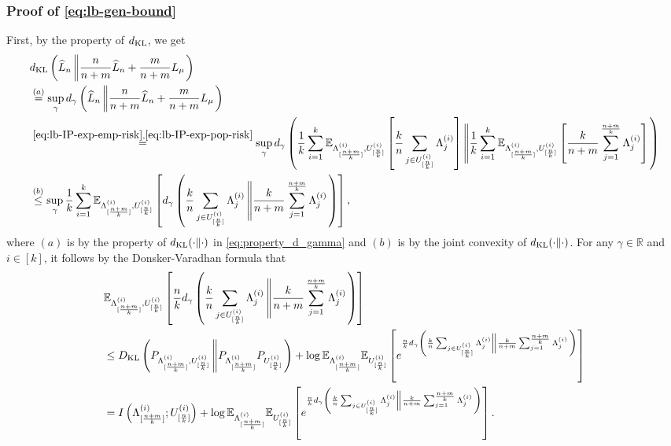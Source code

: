 \documentclass[onecolumn,romanappendices,10pt]{IEEEtran}
\newcommand{\EE}{{\mathbb{E}}}
\newcommand{\RR}{{\mathbb{R}}}
\begin{document}
	\subsubsection{Proof of \eqref{eq:lb-gen-bound}}
	First, by the property of $d_{\textnormal{KL}}$, we get
	\begin{equation}
		\begin{aligned}
			&d_{\textnormal{KL}} \left(\widehat{L}_n \left\| \frac{n}{n+m} \widehat{L}_n + \frac{m}{n+m} L_\mu \right.\right) \\
			&\overset{(a)}{=} \sup_{\gamma} d_{\gamma} \left(\widehat{L}_n \left\| \frac{n}{n+m} \widehat{L}_n + \frac{m}{n+m} L_\mu \right.\right) \\
			&\overset{\eqref{eq:lb-IP-exp-emp-risk}, \eqref{eq:lb-IP-exp-pop-risk}}{=} \sup_{\gamma} d_{\gamma} \left(\frac{1}{k} \sum_{i=1}^k \EE_{\Lambda^{(i)}_{[\frac{n+m}{k}]}, U^{(i)}_{[\frac{n}{k}]}} \left[ \frac{k}{n} \sum_{j \in U^{(i)}_{[\frac{n}{k}]}} \Lambda^{(i)}_j \right] \left\| \frac{1}{k} \sum_{i=1}^k \EE_{\Lambda^{(i)}_{[\frac{n+m}{k}]}, U^{(i)}_{[\frac{n}{k}]}} \left[ \frac{k}{n+m} \sum_{j=1}^{\frac{n+m}{k}} \Lambda^{(i)}_j \right] \right.\right) \\
			&\overset{(b)}{\leq} \sup_{\gamma} \frac{1}{k} \sum_{i=1}^k \EE_{\Lambda^{(i)}_{[\frac{n+m}{k}]}, U^{(i)}_{[\frac{n}{k}]}} \left[ d_{\gamma} \left( \frac{k}{n} \sum_{j \in U^{(i)}_{[\frac{n}{k}]}} \Lambda^{(i)}_j \left\| \frac{k}{n+m} \sum_{j=1}^{\frac{n+m}{k}} \Lambda^{(i)}_j \right. \right) \right],
		\end{aligned}
	\end{equation}
	where $(a)$ is by the property of $d_{\textnormal{KL}}(\cdot \| \cdot)$ in \eqref{eq:property_d_gamma} and $(b)$ is by the joint convexity of $d_{\textnormal{KL}}(\cdot \| \cdot)$. For any $\gamma \in \RR$ and $i \in [k]$, it follows by the Donsker-Varadhan formula that
	\begin{equation}
		\begin{aligned}
			&\EE_{\Lambda^{(i)}_{[\frac{n+m}{k}]}, U^{(i)}_{[\frac{n}{k}]}} \left[ \frac{n}{k} d_{\gamma} \left( \frac{k}{n} \sum_{j \in U^{(i)}_{[\frac{n}{k}]}} \Lambda^{(i)}_j \left\| \frac{k}{n+m} \sum_{j=1}^{\frac{n+m}{k}} \Lambda^{(i)}_j \right. \right) \right] \\
			&\leq D_{\textnormal{KL}}\left( P_{\Lambda^{(i)}_{[\frac{n+m}{k}]},  U^{(i)}_{[\frac{n}{k}]}} \left\| P_{\Lambda^{(i)}_{[\frac{n+m}{k}]}} P_{U^{(i)}_{[\frac{n}{k}]}} \right.\right) + \log \EE_{\Lambda^{(i)}_{[\frac{n+m}{k}]}} \EE_{U^{(i)}_{[\frac{n}{k}]}} \left[ e^{\frac{n}{k} d_{\gamma} \left( \frac{k}{n} \sum_{j \in U^{(i)}_{[\frac{n}{k}]}} \Lambda^{(i)}_j \left\| \frac{k}{n+m} \sum_{j=1}^{\frac{n+m}{k}} \Lambda^{(i)}_j \right. \right)} \right] \\
			&= I\left( \Lambda^{(i)}_{[\frac{n+m}{k}]} ;  U^{(i)}_{[\frac{n}{k}]} \right) + \log \EE_{\Lambda^{(i)}_{[\frac{n+m}{k}]}} \EE_{U^{(i)}_{[\frac{n}{k}]}} \left[ e^{\frac{n}{k} d_{\gamma} \left( \frac{k}{n} \sum_{j \in U^{(i)}_{[\frac{n}{k}]}} \Lambda^{(i)}_j \left\| \frac{k}{n+m} \sum_{j=1}^{\frac{n+m}{k}} \Lambda^{(i)}_j \right. \right)} \right].
		\end{aligned}\label{eq:gen-d_gamma-bound}
	\end{equation}
\end{document}
